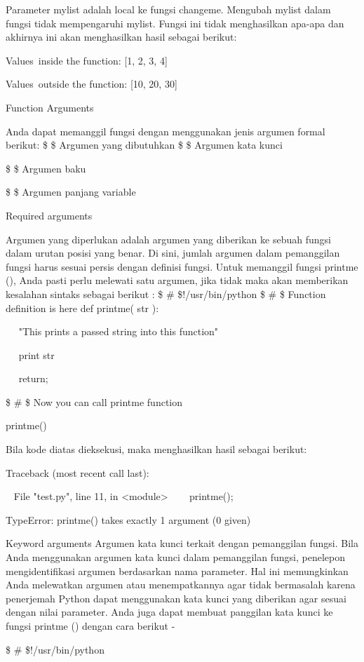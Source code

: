 Parameter mylist adalah local ke fungsi changeme. Mengubah mylist dalam fungsi tidak mempengaruhi mylist. Fungsi ini tidak menghasilkan apa-apa dan akhirnya ini akan menghasilkan hasil sebagai berikut: 

Values~inside the function:  [1, 2, 3, 4] 

Values~outside the function:  [10, 20, 30] 

Function Arguments

Anda dapat memanggil fungsi dengan menggunakan jenis argumen formal berikut: 
\$ \bullet \$ Argumen yang dibutuhkan
\$ \bullet \$ Argumen kata kunci 

\$ \bullet \$ Argumen baku

\$ \bullet \$ Argumen panjang variable

Required arguments 

Argumen yang diperlukan adalah argumen yang diberikan ke sebuah fungsi dalam urutan posisi yang benar. Di sini, jumlah argumen dalam pemanggilan fungsi harus sesuai persis dengan definisi fungsi. Untuk memanggil fungsi printme (), Anda pasti perlu melewati satu argumen, jika tidak maka akan memberikan kesalahan sintaks sebagai berikut :
\$  \#  \$!/usr/bin/python 
\$  \#  \$ Function definition is here 
def printme( str ): 

~~  "This prints a passed string into this function" 

~~  print str

~~  return;

\$  \#  \$ Now you can call printme function 

printme() 

Bila kode diatas dieksekusi, maka menghasilkan hasil sebagai berikut: 

Traceback (most recent call last): 

 ~ File "test.py", line 11, in <module> 
~~~ printme();

 TypeError: printme() takes exactly 1 argument (0 given) 

Keyword arguments 
Argumen kata kunci terkait dengan pemanggilan fungsi. Bila Anda menggunakan argumen kata kunci dalam pemanggilan fungsi, penelepon mengidentifikasi argumen berdasarkan nama parameter. Hal ini memungkinkan Anda melewatkan argumen atau menempatkannya agar tidak bermasalah karena penerjemah Python dapat menggunakan kata kunci yang diberikan agar sesuai dengan nilai parameter. Anda juga dapat membuat panggilan kata kunci ke fungsi printme () dengan cara berikut - 

\$  \#  \$!/usr/bin/python

